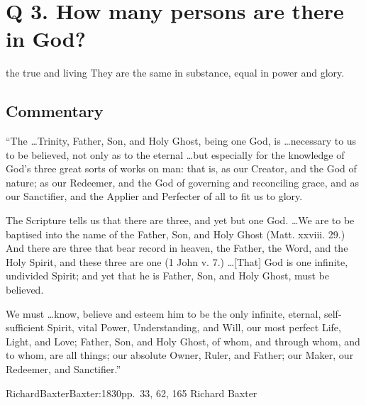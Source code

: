 \documentclass[00-main.tex]{subfiles}
\begin{document}
\section{Q 3. How many persons are there in God?}

the true and living  They are the same in substance, equal in power and glory.


\subsection{Commentary}

``The \dots Trinity, Father, Son, and Holy Ghost, being one God, is \dots ne\-ces\-sa\-ry to us to be believed, not only as to the eternal \dots but especially for the knowledge of God's three great sorts of works on man: that is, as our Creator, and the God of nature; as our Redeemer, and the God of governing and reconciling grace, and as our Sanctifier, and the Applier and Perfecter of all to fit us to glory.

The Scripture tells us that there are three, and yet but one God. \dots  We are to be baptised into the name of the Father, Son, and Holy Ghost (Matt. xxviii. 29.) And there are three that bear record in heaven, the Father, the Word, and the Holy Spirit, and these three are one (1 John v. 7.) \dots  [That] God is one infinite, undivided Spirit; and yet that he is Father, Son, and Holy Ghost, must be believed.

We must \dots know, believe and esteem him to be the only infinite, eternal, self-sufficient Spirit, vital Power, Understanding, and Will, our most perfect Life, Light, and Love; Father, Son, and Holy Ghost, of whom, and through whom, and to whom, are all things; our absolute Owner, Ruler, and Father; our Maker, our Redeemer, and Sanctifier.''

\begin{NameCite}
{Richard}{Baxter}{Baxter:1830}{pp.\ 33, 62, 165}
Richard Baxter\label{baxter:q3}
\end{NameCite}
\end{document}
